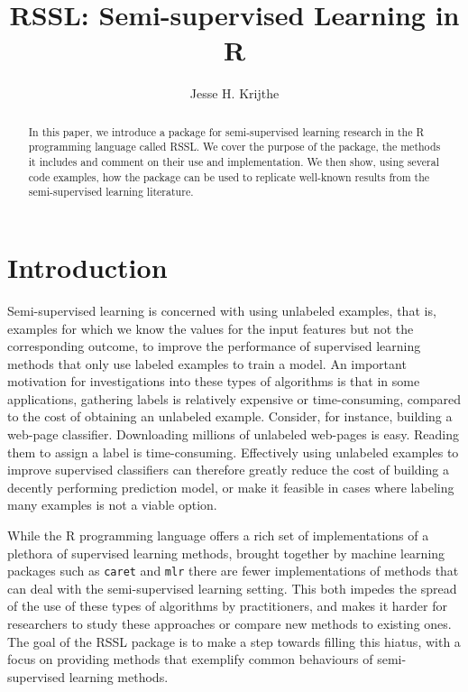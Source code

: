 \documentclass[runningheads,a4paper]{llncs}\usepackage[]{graphicx}\usepackage[]{color}
\begin{document}
\title{RSSL: Semi-supervised Learning in R}

\author{Jesse H. Krijthe}


			
\maketitle

\begin{abstract}
In this paper, we introduce a package for semi-supervised learning research in the R programming language called RSSL. We cover the purpose of the package, the methods it includes and comment on their use and implementation. We then show, using several code examples, how the package can be used to replicate well-known results from the semi-supervised learning literature.
\end{abstract}





\section{Introduction}
Semi-supervised learning is concerned with using unlabeled examples, that is, examples for which we know the values for the input features but not the corresponding outcome, to improve the performance of supervised learning methods that only use labeled examples to train a model. An important motivation for investigations into these types of algorithms is that in some applications, gathering labels is relatively expensive or time-consuming, compared to the cost of obtaining an unlabeled example. Consider, for instance, building a web-page classifier. Downloading millions of unlabeled web-pages is easy. Reading them to assign a label is time-consuming. Effectively using unlabeled examples to improve supervised classifiers can therefore greatly reduce the cost of building a decently performing prediction model, or make it feasible in cases where labeling many examples is not a viable option.

While the R programming language \cite{RCoreTeam2016} offers a rich set of implementations of a plethora of supervised learning methods, brought together by machine learning packages such as \texttt{caret} and \texttt{mlr} there are fewer implementations of methods that can deal with the semi-supervised learning setting. This both impedes the spread of the use of these types of algorithms by practitioners, and makes it harder for researchers to study these approaches or compare new methods to existing ones.  The goal of the RSSL package is to make a step towards filling this hiatus, with a focus on providing methods that exemplify common behaviours of semi-supervised learning methods.
\end{document}
